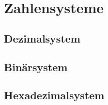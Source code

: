 \section{Zahlensysteme}

\subsection{Dezimalsystem}

\subsection{Binärsystem}

\subsection{Hexadezimalsystem}
